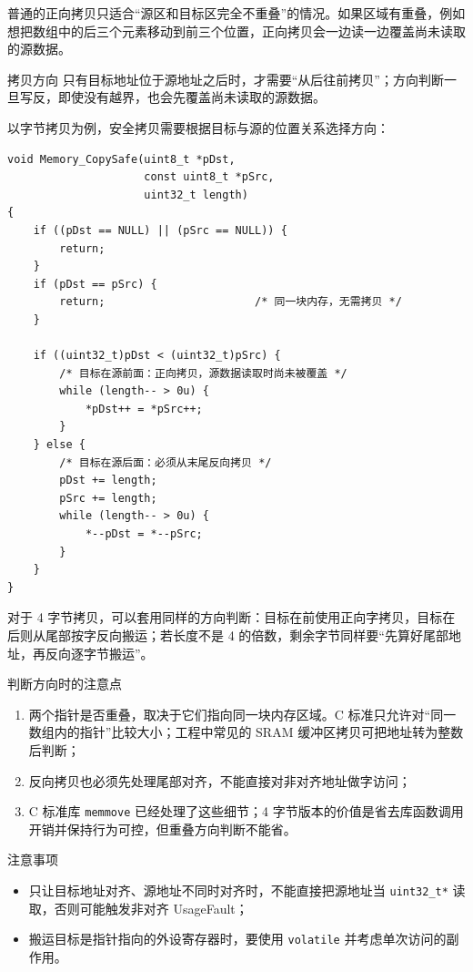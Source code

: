 普通的正向拷贝只适合“源区和目标区完全不重叠”的情况。如果区域有重叠，例如想把数组中的后三个元素移动到前三个位置，正向拷贝会一边读一边覆盖尚未读取的源数据。

\begin{anybox}{拷贝方向}
只有目标地址位于源地址之后时，才需要“从后往前拷贝”；方向判断一旦写反，即使没有越界，也会先覆盖尚未读取的源数据。
\end{anybox}

以字节拷贝为例，安全拷贝需要根据目标与源的位置关系选择方向：

\begin{lstlisting}[style=c]
void Memory_CopySafe(uint8_t *pDst,
                     const uint8_t *pSrc,
                     uint32_t length)
{
    if ((pDst == NULL) || (pSrc == NULL)) {
        return;
    }
    if (pDst == pSrc) {
        return;                       /* 同一块内存，无需拷贝 */
    }

    if ((uint32_t)pDst < (uint32_t)pSrc) {
        /* 目标在源前面：正向拷贝，源数据读取时尚未被覆盖 */
        while (length-- > 0u) {
            *pDst++ = *pSrc++;
        }
    } else {
        /* 目标在源后面：必须从末尾反向拷贝 */
        pDst += length;
        pSrc += length;
        while (length-- > 0u) {
            *--pDst = *--pSrc;
        }
    }
}
\end{lstlisting}

对于 4 字节拷贝，可以套用同样的方向判断：目标在前使用正向字拷贝，目标在后则从尾部按字反向搬运；若长度不是 4 的倍数，剩余字节同样要“先算好尾部地址，再反向逐字节搬运”。

\begin{anybox}{判断方向时的注意点}

\begin{enumerate}
\item 两个指针是否重叠，取决于它们指向同一块内存区域。C 标准只允许对“同一数组内的指针”比较大小；工程中常见的 SRAM 缓冲区拷贝可把地址转为整数后判断；
\item 反向拷贝也必须先处理尾部对齐，不能直接对非对齐地址做字访问；
\item C 标准库 \texttt{memmove} 已经处理了这些细节；4 字节版本的价值是省去库函数调用开销并保持行为可控，但重叠方向判断不能省。
\end{enumerate}

\end{anybox}
\begin{anybox}{注意事项}

\begin{itemize}
\item 只让目标地址对齐、源地址不同时对齐时，不能直接把源地址当 \texttt{uint32\_t*} 读取，否则可能触发非对齐 UsageFault；
\item 搬运目标是指针指向的外设寄存器时，要使用 \texttt{volatile} 并考虑单次访问的副作用。
\end{itemize}

\end{anybox}
